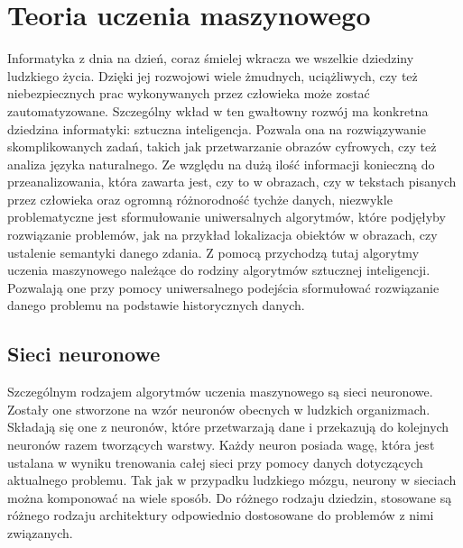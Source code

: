 \newpage
\section{Teoria uczenia maszynowego}
Informatyka z dnia na dzień, coraz śmielej wkracza we wszelkie dziedziny ludzkiego życia. Dzięki jej rozwojowi wiele żmudnych, uciążliwych, czy też niebezpiecznych prac wykonywanych przez człowieka może zostać zautomatyzowane. Szczególny wkład w ten gwałtowny rozwój ma konkretna dziedzina informatyki: sztuczna inteligencja. Pozwala ona na rozwiązywanie skomplikowanych zadań, takich jak przetwarzanie obrazów cyfrowych, czy też analiza języka naturalnego. Ze względu na dużą ilość informacji konieczną do przeanalizowania, która zawarta jest, czy to w obrazach, czy w tekstach pisanych przez człowieka oraz ogromną różnorodność tychże danych, niezwykle problematyczne jest sformułowanie uniwersalnych algorytmów, które podjęłyby rozwiązanie problemów, jak na przykład lokalizacja obiektów w obrazach, czy ustalenie semantyki danego zdania. Z pomocą przychodzą tutaj algorytmy uczenia maszynowego należące do rodziny algorytmów sztucznej inteligencji. Pozwalają one przy pomocy uniwersalnego podejścia sformułować rozwiązanie danego problemu na podstawie historycznych danych.
\subsection{Sieci neuronowe}
Szczególnym rodzajem algorytmów uczenia maszynowego są sieci neuronowe. Zostały one stworzone na wzór neuronów obecnych w ludzkich organizmach. Składają się one z neuronów, które przetwarzają dane i przekazują do kolejnych neuronów razem tworzących warstwy. Każdy neuron posiada wagę, która jest ustalana w wyniku trenowania całej sieci przy pomocy danych dotyczących aktualnego problemu. Tak jak w przypadku ludzkiego mózgu, neurony w sieciach można komponować na wiele sposób. Do różnego rodzaju dziedzin, stosowane są różnego rodzaju architektury odpowiednio dostosowane do problemów z nimi związanych.
